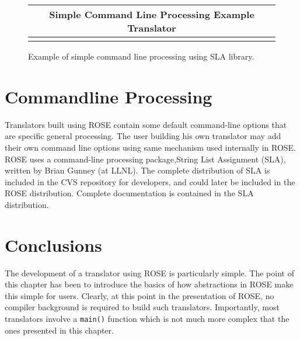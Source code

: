 {\indent
{\mySmallFontSize

\begin{latexonly}
\begin{figure}[tb]
\begin{center}
\begin{tabular}{|c|} \hline
     Simple Command Line Processing Example Translator
\\\hline\hline

\\\hline
\end{tabular}
\end{center}
\caption{ Example of simple command line processing using SLA library. }
\end{figure}
\end{latexonly}

\begin{htmlonly}
   
\end{htmlonly}

\label{translatorDesign:commandLineProcessing}
}
}

\section{Commandline Processing}

   Translators built using ROSE contain some default command-line options that
are specific general processing.  The user building his own translator may add 
their own command line options using same mechanism used internally in ROSE.
ROSE uses a command-line processing package,String List Assignment (SLA), written 
by Brian Gunney (at LLNL).  The complete distribution of SLA is included in the
CVS repository for developers, and could later be included in the ROSE distribution.
Complete documentation is contained in the SLA distribution.  


\section{Conclusions}

   The development of a translator using ROSE is particularly simple.  The point
of this chapter has been to introduce the basics of how abstractions in ROSE make this
simple for users.  Clearly, at this point in the presentation of ROSE, no compiler 
background is required to build such translators.  Importantly, most translators 
involve a {\tt main()} function which is not much more complex that the ones presented
in this chapter.






